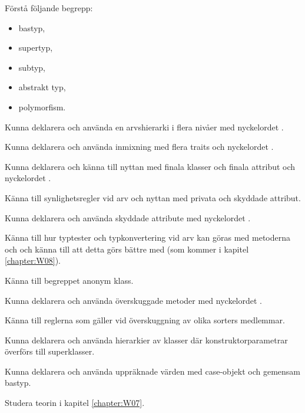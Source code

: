 

\Exercise{\ExeWeekSEVEN}

\begin{Goals}
\item Förstå följande begrepp: 
  \begin{itemize}[nosep, label={$\square$},] 
  \item bastyp,  \item supertyp, \item subtyp, \item abstrakt typ, \item polymorfism. 
  \end{itemize}
\item Kunna deklarera och använda en arvshierarki i flera nivåer med nyckelordet .
\item Kunna deklarera och använda inmixning med flera traits och nyckelordet .
\item Kunna deklarera och känna till nyttan med finala klasser och finala attribut och nyckelordet .  
\item Känna till synlighetsregler vid arv och nyttan med privata och skyddade attribut.
\item Kunna deklarera och använda skyddade attribute med nyckelordet .
\item Känna till hur typtester och typkonvertering vid arv kan göras med metoderna  och  och känna till att detta görs bättre med  (som kommer i kapitel \ref{chapter:W08}).
\item Känna till begreppet anonym klass.
\item Kunna deklarera och använda överskuggade metoder med nyckelordet .
\item Känna till reglerna som gäller vid överskuggning av olika sorters medlemmar.
\item Kunna deklarera och använda hierarkier av klasser där konstruktorparametrar överförs till superklasser. 
\item Kunna deklarera och använda uppräknade värden med case-objekt och gemensam bastyp.
\end{Goals}

\begin{Preparations}
\item Studera teorin i kapitel \ref{chapter:W07}.
\end{Preparations}

